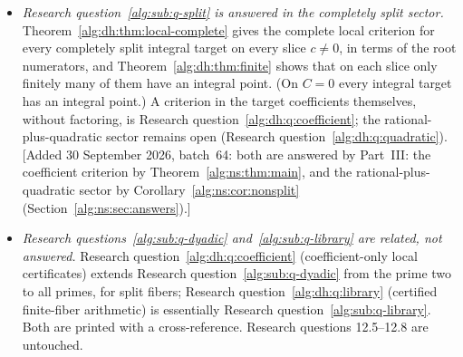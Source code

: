 \documentclass[11pt]{article}
\numberwithin{equation}{section}
\theoremstyle{plain}
\theoremstyle{plain}
\theoremstyle{plain}
\theoremstyle{definition}
\theoremstyle{definition}
\theoremstyle{definition}
\theoremstyle{remark}
\begin{document}
\begin{itemize}[itemsep=2pt,topsep=3pt]
\item \emph{Research question~\ref{alg:sub:q-split} is answered in the
completely split sector.} Theorem~\ref{alg:dh:thm:local-complete} gives
the complete local criterion for every completely split integral target on
every slice $c\ne0$, in terms of the root numerators, and
Theorem~\ref{alg:dh:thm:finite} shows that on each slice only finitely
many of them have an integral point. (On $C=0$ every integral target has
an integral point.) A criterion in the target coefficients themselves,
without factoring, is Research question~\ref{alg:dh:q:coefficient}; the
rational-plus-quadratic sector remains open (Research
question~\ref{alg:dh:q:quadratic}).
[Added 30 September 2026, batch~64: both are answered by Part~III: the
coefficient criterion by Theorem~\ref{alg:ns:thm:main}, and the
rational-plus-quadratic sector by Corollary~\ref{alg:ns:cor:nonsplit}
(Section~\ref{alg:ns:sec:answers}).]
\item \emph{Research questions~\ref{alg:sub:q-dyadic}
and~\ref{alg:sub:q-library} are related, not answered.} Research
question~\ref{alg:dh:q:coefficient} (coefficient-only local certificates)
extends Research question~\ref{alg:sub:q-dyadic} from the prime two to all
primes, for split fibers; Research question~\ref{alg:dh:q:library}
(certified finite-fiber arithmetic) is essentially Research
question~\ref{alg:sub:q-library}. Both are printed with a cross-reference.
Research questions 12.5--12.8 are untouched.
\end{itemize}
\end{document}
